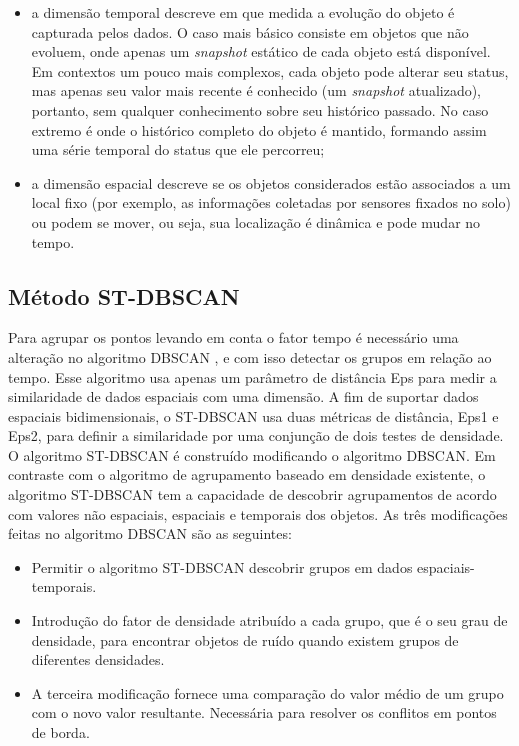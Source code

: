 \begin{itemize}
	\item a dimensão temporal descreve em que medida a evolução do objeto é capturada pelos dados. O caso mais básico consiste em objetos que não evoluem, onde apenas um \textit{snapshot} estático de cada objeto está disponível. Em contextos um pouco mais complexos, cada objeto pode alterar seu status, mas apenas seu valor mais recente é conhecido (um \textit{snapshot} atualizado), portanto, sem qualquer conhecimento sobre seu histórico passado. No caso extremo é onde o histórico completo do objeto é mantido, formando assim uma série temporal do status que ele percorreu;

	\item a dimensão espacial descreve se os objetos considerados estão associados a um local fixo (por exemplo, as informações coletadas por sensores fixados no solo) ou podem se mover, ou seja, sua localização é dinâmica e pode mudar no tempo.
\end{itemize}

\subsection{Método ST-DBSCAN}
\label{stdbscan}

Para agrupar os pontos levando em conta o fator tempo é necessário uma alteração no algoritmo DBSCAN \cite{ESTER1998}, e com isso detectar os grupos em relação ao tempo. Esse algoritmo usa apenas um parâmetro de distância Eps para medir a similaridade de dados espaciais com uma dimensão. A fim de suportar dados espaciais bidimensionais, o ST-DBSCAN \cite{Birant2007STDBSCANAA} usa duas métricas de distância, Eps1 e Eps2, para definir a similaridade por uma conjunção de dois testes de densidade.
O algoritmo ST-DBSCAN é construído modificando o algoritmo DBSCAN. Em contraste com o algoritmo de agrupamento baseado em densidade existente, o algoritmo ST-DBSCAN tem a capacidade de descobrir agrupamentos de acordo com valores não espaciais, espaciais e temporais dos objetos. As três modificações feitas no algoritmo DBSCAN são as seguintes:
\begin{itemize}
\item Permitir o algoritmo ST-DBSCAN descobrir grupos em dados espaciais-temporais.
\item Introdução do fator de densidade atribuído a cada grupo, que é o seu grau de densidade, para encontrar objetos de ruído quando existem grupos de diferentes densidades.
\item A terceira modificação fornece uma comparação do valor médio de um grupo com o novo valor resultante. Necessária para resolver os conflitos em pontos de borda.
\end{itemize}

